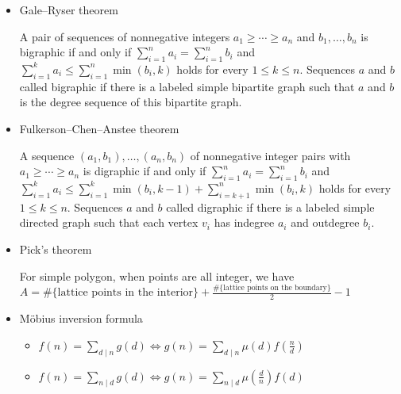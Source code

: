 \begin{itemize}
    \item Gale–Ryser theorem
    
    A pair of sequences of nonnegative integers $a_1\ge\cdots\ge a_n$ and $b_1,\ldots,b_n$ is bigraphic if and only if $\displaystyle\sum_{i=1}^n a_i=\displaystyle\sum_{i=1}^n b_i$ and $\displaystyle\sum_{i=1}^k a_i\le \displaystyle\sum_{i=1}^n\min(b_i,k)$ holds for every $1\le k\le n$. Sequences $a$ and $b$ called bigraphic if there is a labeled simple bipartite graph such that $a$ and $b$ is the degree sequence of this bipartite graph.
    
    \item Fulkerson–Chen–Anstee theorem
    
    A sequence $(a_1,b_1),\ldots,(a_n,b_n)$ of nonnegative integer pairs with $a_1\ge\cdots\ge a_n$ is digraphic if and only if $\displaystyle\sum_{i=1}^n a_i=\displaystyle\sum_{i=1}^n b_i$ and $\displaystyle\sum_{i=1}^k a_i\le \displaystyle\sum_{i=1}^k\min(b_i,k-1)+\displaystyle\sum_{i=k+1}^n\min(b_i,k)$ holds for every $1\le k\le n$. Sequences $a$ and $b$ called digraphic if there is a labeled simple directed graph such that each vertex $v_i$ has indegree $a_i$ and outdegree $b_i$.
    
    \item Pick's theorem
    
    For simple polygon, when points are all integer, we have $A=\text{\#\{lattice points in the interior\}} + \frac{\text{\#\{lattice points on the boundary\}}}{2} - 1$
    
    \item Möbius inversion formula
    
    \begin{itemize}
        \itemsep-0.5em
      \item $f(n)=\sum_{d\mid n}g(d)\Leftrightarrow g(n)=\sum_{d\mid n}\mu(d)f(\frac{n}{d})$
      \item $f(n)=\sum_{n\mid d}g(d)\Leftrightarrow g(n)=\sum_{n\mid d}\mu(\frac{d}{n})f(d)$
    \end{itemize}
    
    
\end{itemize}